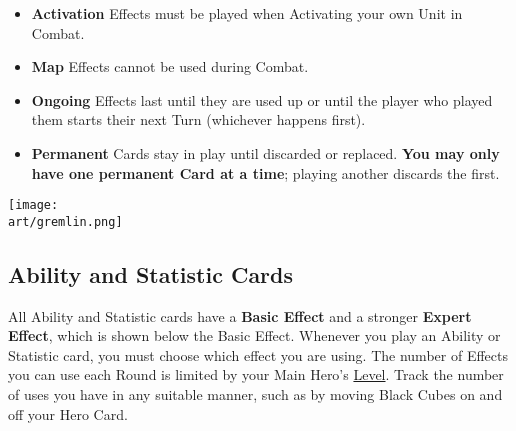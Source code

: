 \begin{multicols*}{2}
\begin{enumerate}
\begin{itemize}
    \item \textbf{Activation}  Effects must be played when Activating your own Unit in Combat.
    \item \textbf{Map}  Effects cannot be used during Combat.
    \item \textbf{Ongoing}  Effects last until they are used up or until the player who played them starts their next Turn (whichever happens first).
    \item \textbf{Permanent}  Cards stay in play until discarded or replaced.
      \textbf{You may only have one permanent Card at a time}; playing another discards the first.
  \end{itemize}
\end{enumerate}

\vfill
\hfill\texttt{[image: \\art/gremlin.png]}

\clearpage

\subsection*{\hypertarget{Ability}{Ability} and \hypertarget{Statistic}{Statistic} Cards}

All Ability and Statistic cards have a \textbf{Basic Effect} and a stronger \textbf{Expert}  \textbf{Effect}, which is shown below the Basic Effect.
Whenever you play an Ability or Statistic card, you must choose which effect you are using.
The number of  Effects you can use each Round is limited by your Main Hero's \hyperlink{Level}{Level}.
Track the number of uses you have in any suitable manner, such as by moving Black Cubes on and off your Hero Card.\par
\bigskip


\end{multicols*}
